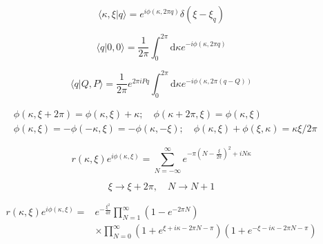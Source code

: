 \documentclass[main.tex]{subfiles}
\begin{document}
\begin{equation}\label{16.23}
	\langle\kappa, \xi | q\rangle= e^{i \phi(\kappa, 2 \pi q)} \delta\left(\xi-\xi_{q}\right)
\end{equation}



\begin{equation}\label{16.24}
	\langle q | 0,0\rangle=\frac{1}{2 \pi} \int_{0}^{2 \pi} \mathrm{d} \kappa e^{-i \phi(\kappa, 2 \pi q)}
\end{equation}



\begin{equation}\label{16.25}
	\langle q | Q, P\rangle=\frac{1}{2 \pi} e^{2 \pi i P q} \int_{0}^{2 \pi} \mathrm{d} \kappa e^{-i \phi(\kappa, 2 \pi(q-Q))}
\end{equation}



\begin{equation}\label{16.26}
	\begin{aligned}
&\phi(\kappa, \xi+2 \pi)=\phi(\kappa, \xi)+\kappa ; \quad \phi(\kappa+2 \pi, \xi)=\phi(\kappa, \xi)\\
&\phi(\kappa, \xi)=-\phi(-\kappa, \xi)=-\phi(\kappa,-\xi) ; \quad \phi(\kappa, \xi)+\phi(\xi, \kappa)=\kappa \xi / 2 \pi
\end{aligned}
\end{equation}



\begin{equation}\label{16.28}
	r(\kappa, \xi) e^{i \phi(\kappa, \xi)}=\sum_{N=-\infty}^{\infty} e^{-\pi\left(N-\frac{\xi}{2 \pi}\right)^{2}+i N \kappa}
\end{equation}



\begin{equation}\label{16.29}
	\xi \rightarrow \xi+2 \pi, \quad N \rightarrow N+1
\end{equation}



\begin{equation}\label{16.30}
	\begin{aligned}
r(\kappa, \xi) e^{i \phi(\kappa, \xi)}=& e^{-\frac{\xi^{2}}{4 \pi}} \prod_{N=1}^{\infty}\left(1-e^{-2 \pi N}\right) \\
& \times \prod_{N=0}^{\infty}\left(1+e^{\xi+i \kappa-2 \pi N-\pi}\right)\left(1+e^{-\xi-i \kappa-2 \pi N-\pi}\right)
\end{aligned}
\end{equation}
\end{document}
